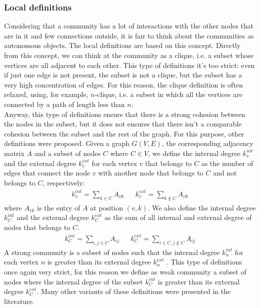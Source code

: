 \subsubsection{Local definitions}\label{local-def}
Considering that a community has a lot of interactions with the other nodes that are in it and few connections outside, it is fair to think about the communities as autonomous objects.
The local definitions are based on this concept. Directly from this concept, we can think at the community as a clique, i.e. a subset whose vertices are all adjacent to each other. This type of definitions it's too strict: even if just one edge is not present, the subset is not a clique, but the subset has a very high concentration of edges. For this reason, the clique definition is often relaxed, using, for example, $n$-clique, i.e. a subset in which all the vertices are connected by a path of length less than $n$.\\
Anyway, this type of definitions ensure that there is a strong cohesion between the nodes in the subset, but it does not ensures that there isn't a comparable cohesion between the subset and the rest of the graph. For this purpose, other definitions were proposed. 
Given a graph $G(V,E)$, the corresponding adjacency matrix $A$ and a subset of nodes $C$ where $C \in V$, we define the internal degree $k_v^{int}$ and the external degree $k_v^{ext}$ for each vertex $v$ that belongs to $C$ as the number of edges that connect the node $v$ with another node that belongs to $C$ and not belongs to $C$, respectively:
\begin{align}
k_v^{int}= \sum_{k \in C} A_{vk} && k_v^{ext}= \sum_{k \notin C} A_{vk}
\end{align}
where $A_{vk}$ is the entry of $A$ at position $(v,k)$. We also define the internal degree $k_C^{int}$ and the external degree $k_C^{ext}$ as the sum of all internal and external degree of nodes that belongs to $C$. 
\begin{align}
k_C^{int}= \sum_{i,j \in C} A_{ij} && k_C^{ext}= \sum_{i\in C, j \notin C} A_{ij}
\end{align}
A strong community is a subset of nodes such that the internal degree $k_n^{int}$  for each vertex $n$ is greater than its external degree $k_n^{ext}$ . This type of definitions once again very strict, for this reason we define as weak community a subset of nodes where the internal degree of the subset  $k_C^{int}$ is greater than its external degree $k_C^{ext}$. Many other variants of these definitions were presented in the literature.
